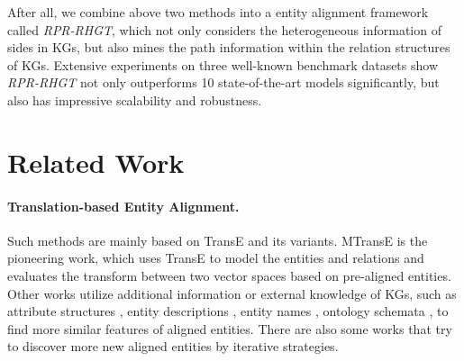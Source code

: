 \documentclass{article}
\begin{document}
After all, we combine above two methods into a entity alignment framework called \textit{RPR-RHGT}, which not only considers the heterogeneous information of sides in KGs, but also mines the path information within the relation structures of KGs.
Extensive experiments on three well-known benchmark datasets show \textit{RPR-RHGT} not only outperforms 10 state-of-the-art models significantly, but also has impressive scalability and robustness.


\section{Related Work}
\label{sec2} 
\paragraph{Translation-based Entity Alignment.}
Such methods are mainly based on TransE \cite{bordes_translating_2013} and its variants. %
MTransE \cite{chen_multilingual_2017} is the pioneering work, which uses TransE to model the entities and relations and evaluates the transform between two vector spaces based on pre-aligned entities.
Other works utilize additional information or external knowledge of KGs, such as 
attribute structures \cite{sun_cross-lingual_2017,zhang_multi-view_2019,trisedya_entity_2019}, 
entity descriptions \cite{chen_co-training_2018}, entity names \cite{zhang_multi-view_2019}, 
ontology schemata \cite{xiang_ontoea_2021}, 
to find more similar features of aligned entities.
There are also some works \cite{sun_bootstrapping_2018,zhu_iterative_2017} that try to discover more new aligned entities by iterative strategies.
\end{document}
